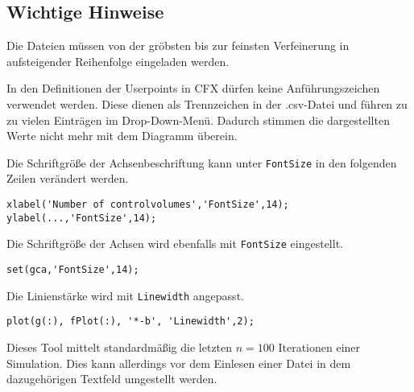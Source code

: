 \subsection{Wichtige Hinweise}
\lstset{language=Matlab}
\begin{description}
\item Die Dateien müssen von der gröbsten bis zur feinsten Verfeinerung in aufsteigender Reihenfolge eingeladen werden.
\item In den Definitionen der Userpoints in CFX dürfen keine Anführungszeichen verwendet werden. Diese dienen als Trennzeichen in der .csv-Datei und führen zu zu vielen Einträgen im Drop-Down-Menü. Dadurch stimmen die dargestellten Werte nicht mehr mit dem Diagramm überein.
\item Die Schriftgröße der Achsenbeschriftung kann unter \texttt{FontSize} in den folgenden Zeilen verändert werden.
\begin{lstlisting}[frame=single]
xlabel('Number of controlvolumes','FontSize',14);
ylabel(...,'FontSize',14);
\end{lstlisting}
\item Die Schriftgröße der Achsen wird ebenfalls mit \texttt{FontSize} eingestellt.
\begin{lstlisting}[frame=single]
set(gca,'FontSize',14);
\end{lstlisting}
\item Die Linienstärke wird  mit \texttt{Linewidth} angepasst.
\begin{lstlisting}[frame=single]
plot(g(:), fPlot(:), '*-b', 'Linewidth',2);
\end{lstlisting}
\item Dieses Tool mittelt standardmäßig die letzten $n=100$ Iterationen einer Simulation. Dies kann allerdings vor dem Einlesen einer Datei in dem dazugehörigen Textfeld umgestellt werden. 
\end{description}

